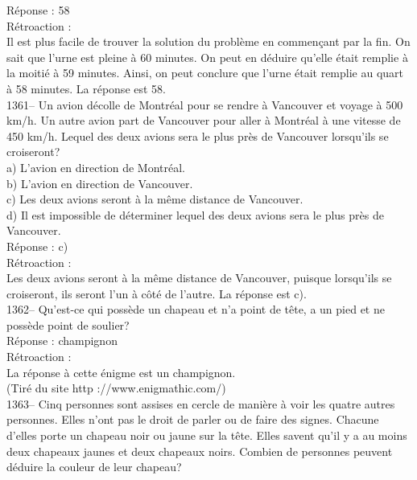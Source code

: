 ﻿\documentclass[letterpaper, 12pt]{article}
\begin{document}
R\'eponse : 58\\

R\'etroaction : \\
Il est plus facile de trouver la solution du probl\`eme en commen\c cant par
la fin.  On sait que l'urne est pleine \`a 60 minutes.  On peut en d\'eduire
qu'elle \'etait remplie \`a la moiti\'e \`a 59 minutes.  Ainsi, on peut
conclure que l'urne \'etait remplie au quart \`a 58 minutes.  La r\'eponse
est 58.\\

1361-- Un avion d\'ecolle de Montr\'eal pour se rendre \`a Vancouver et
voyage \`a 500 km/h.  Un autre avion part de Vancouver pour aller \`a
Montr\'eal \`a une vitesse de 450 km/h.  Lequel des deux avions sera le plus
pr\`es de Vancouver lorsqu'ils se croiseront?\\
a) L'avion en direction de Montr\'eal.\\
b) L'avion en direction de Vancouver.\\
c) Les deux avions seront \`a la m\^eme distance de Vancouver.\\
d) Il est impossible de d\'eterminer lequel des deux avions sera le plus
pr\`es de Vancouver.\\

R\'eponse : c)\\

R\'etroaction : \\
Les deux avions seront \`a la m\^eme distance de Vancouver, puisque
lorsqu'ils se croiseront, ils seront l'un \`a c\^ot\'e de l'autre.  La
r\'eponse est c).\\



1362-- Qu'est-ce qui poss\`ede un chapeau et n'a point de t\^ete, a un pied
et ne poss\`ede point de soulier?\\

R\'eponse : champignon\\

R\'etroaction : \\
La r\'eponse \`a cette \'enigme est un champignon.\\
(Tir\'e du site http ://www.enigmathic.com/)\\





1363-- Cinq personnes sont assises en cercle de mani\`ere \`a voir les
quatre autres personnes.  Elles n'ont pas le droit de parler ou de faire des
signes.  Chacune d'elles porte un chapeau noir ou jaune sur la t\^ete.
Elles savent qu'il y a au moins deux chapeaux jaunes et deux chapeaux noirs.
  Combien de personnes peuvent d\'eduire la couleur de leur chapeau?\\
\end{document}
